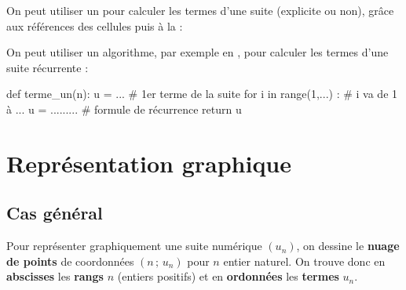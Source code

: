 \documentclass[a4paper,11pt]{article}
\begin{document}
\begin{clog}
On peut utiliser un  pour calculer les termes d'une suite (explicite ou non), grâce aux références des cellules puis à la  :

\smallskip


\smallskip

\end{clog}

\begin{calgo}
On peut utiliser un algorithme, par exemple en \calgpython, pour calculer les termes d'une suite récurrente :
\begin{envpython}[12cm]
	def terme_un(n):
		u = ...                     # 1er terme de la suite
		for i in range(1,...) :     # i va de 1 à ...
			u = .........           # formule de récurrence
		return u
\end{envpython}
\end{calgo}

\section{Représentation graphique}

\subsection{Cas général}

\begin{cmethode}
Pour représenter graphiquement une suite numérique $(u_n)$, on dessine le \textbf{nuage de points} de coordonnées $(n\,;\,u_n)$ pour $n$ entier naturel. On trouve donc en \textbf{abscisses} les \textbf{rangs} $n$ (entiers positifs) et en \textbf{ordonnées} les \textbf{termes} $u_n$.
\end{cmethode}
\end{document}
